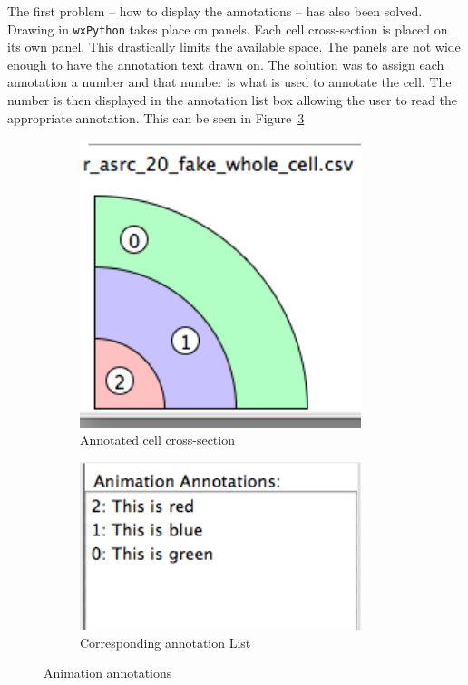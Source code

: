 The first problem -- how to display the annotations -- has also been solved.  Drawing in \texttt{wxPython} takes place on panels.  Each cell cross-section is placed on its own panel.  This drastically limits the available space.  The panels are not wide enough to have the annotation text drawn on.  The solution was to assign each annotation a number and that number is what is used to annotate the cell.  The number is then displayed in the annotation list box allowing the user to read the appropriate annotation.  This can be seen in Figure~\ref{fig:annotation_whole}

\begin{figure}[h!]
    \centering
    \begin{subfigure}[b]{0.4\textwidth}
        \centering
        \includegraphics[width=0.9\textwidth]{images/annotation_whole_b.png}
        \caption{Annotated cell cross-section}
        \label{fig:annotation_whole_cell}
    \end{subfigure}
    \begin{subfigure}[b]{0.4\textwidth}
        \centering
        \includegraphics[width=0.9\textwidth]{images/annotation_whole_a.png}
        \caption{Corresponding annotation List}
        \label{fig:annotation_whole_list}
    \end{subfigure}
    \caption{Animation annotations}
    \label{fig:annotation_whole}
\end{figure}

